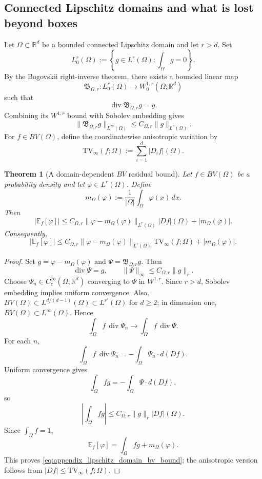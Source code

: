 \documentclass[11pt,letterpaper]{article}
\newtheorem{theorem}{Theorem}[section]
\theoremstyle{definition}
\theoremstyle{remark}
\newcommand{\TV}{\mathrm{TV}}
\begin{document}
  
\subsection{Connected Lipschitz domains and what is lost beyond boxes}
\label{subsec:appendix_lipschitz_domains}
  

Let $\Omega\subset\mathbb R^d$ be a bounded connected Lipschitz domain and let
$r>d$. Set
$$
L_0^r(\Omega)
:=
\left\{g\in L^r(\Omega):\int_\Omega g=0\right\}.
$$
By the Bogovskii right-inverse theorem, there exists a bounded linear map
\cite{AcostaDuranMuschietti2006}
$$
\mathfrak B_{\Omega,r}:L_0^r(\Omega)
\longrightarrow W_0^{1,r}(\Omega;\mathbb R^d)
$$
such that
$$
\operatorname{div}\mathfrak B_{\Omega,r}g=g.
$$
Combining its $W^{1,r}$ bound with Sobolev embedding gives
\begin{equation}
\label{eq:appendix_bogovskii_sup_bound}
\|\mathfrak B_{\Omega,r}g\|_{L^\infty(\Omega)}
\le
C_{\Omega,r}\|g\|_{L^r(\Omega)}.
\end{equation}
For $f\in BV(\Omega)$, define the coordinatewise anisotropic variation by
$$
\TV_\infty(f;\Omega)
:=
\sum_{i=1}^d|D_if|(\Omega).
$$

\begin{theorem}[A domain-dependent $BV$ residual bound]
\label{thm:appendix_lipschitz_domain_bv_bound}
Let $f\in BV(\Omega)$ be a probability density and let
$\varphi\in L^r(\Omega)$. Define
$$
m_\Omega(\varphi)
:=
\frac1{|\Omega|}\int_\Omega\varphi(x)\,dx.
$$
Then
\begin{equation}
\label{eq:appendix_lipschitz_domain_bv_bound}
|\mathbb E_f[\varphi]|
\le
C_{\Omega,r}
\|\varphi-m_\Omega(\varphi)\|_{L^r(\Omega)}
|Df|(\Omega)
+
|m_\Omega(\varphi)|.
\end{equation}
Consequently,
\begin{equation}
\label{eq:appendix_lipschitz_domain_anisotropic_bound}
|\mathbb E_f[\varphi]|
\le
C_{\Omega,r}
\|\varphi-m_\Omega(\varphi)\|_{L^r(\Omega)}
\TV_\infty(f;\Omega)
+
|m_\Omega(\varphi)|.
\end{equation}
\end{theorem}

\begin{proof}
Set $g=\varphi-m_\Omega(\varphi)$ and
$\Psi=\mathfrak B_{\Omega,r}g$. Then
$$
\operatorname{div}\Psi=g,
\qquad
\|\Psi\|_\infty\le C_{\Omega,r}\|g\|_r.
$$
Choose $\Psi_n\in C_c^\infty(\Omega;\mathbb R^d)$ converging to $\Psi$ in
$W^{1,r}$. Since $r>d$, Sobolev embedding implies uniform convergence. Also,
$BV(\Omega)\subset L^{d/(d-1)}(\Omega)\subset L^{r'}(\Omega)$ for $d\ge2$;
in dimension one, $BV(\Omega)\subset L^\infty(\Omega)$. Hence
$$
\int_\Omega f\,\operatorname{div}\Psi_n
\longrightarrow
\int_\Omega f\,\operatorname{div}\Psi.
$$
For each $n$,
$$
\int_\Omega f\,\operatorname{div}\Psi_n
=
-\int_\Omega\Psi_n\cdot d(Df).
$$
Uniform convergence gives
$$
\int_\Omega fg
=
-\int_\Omega\Psi\cdot d(Df),
$$
so
$$
\left|\int_\Omega fg\right|
\le
C_{\Omega,r}\|g\|_r|Df|(\Omega).
$$
Since $\int_\Omega f=1$,
$$
\mathbb E_f[\varphi]
=
\int_\Omega fg+m_\Omega(\varphi).
$$
This proves \eqref{eq:appendix_lipschitz_domain_bv_bound}; the anisotropic
version follows from $|Df|\le \TV_\infty(f;\Omega)$.
\end{proof}
\end{document}
